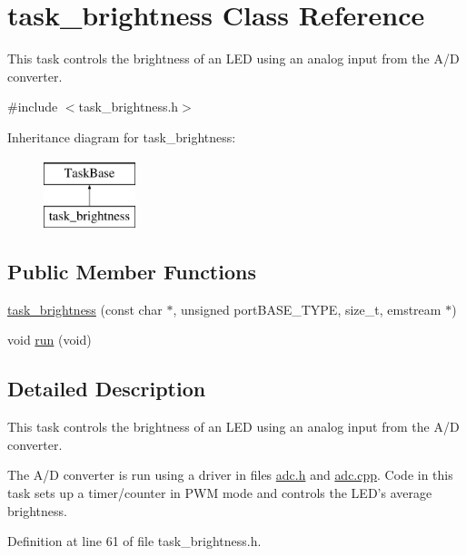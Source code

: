 \hypertarget{classtask__brightness}{\section{task\-\_\-brightness Class Reference}
\label{classtask__brightness}
}


This task controls the brightness of an L\-E\-D using an analog input from the A/\-D converter.  




{\ttfamily \#include $<$task\-\_\-brightness.\-h$>$}

Inheritance diagram for task\-\_\-brightness\-:\begin{figure}[H]
\begin{center}
\leavevmode
\includegraphics[height=2.000000cm]{classtask__brightness}
\end{center}
\end{figure}
\subsection*{Public Member Functions}
\begin{DoxyCompactItemize}
\item 
\hyperlink{classtask__brightness_a5802baf3a0c9fe53ccbce8966d1fad47}{task\-\_\-brightness} (const char $\ast$, unsigned port\-B\-A\-S\-E\-\_\-\-T\-Y\-P\-E, size\-\_\-t, emstream $\ast$)
\item 
void \hyperlink{classtask__brightness_a615beac07a99f0856f048a46fd9a3898}{run} (void)
\end{DoxyCompactItemize}


\subsection{Detailed Description}
This task controls the brightness of an L\-E\-D using an analog input from the A/\-D converter. 

The A/\-D converter is run using a driver in files {\ttfamily \hyperlink{adc_8h}{adc.\-h}} and {\ttfamily \hyperlink{adc_8cpp}{adc.\-cpp}}. Code in this task sets up a timer/counter in P\-W\-M mode and controls the L\-E\-D's average brightness. 

Definition at line 61 of file task\-\_\-brightness.\-h.



